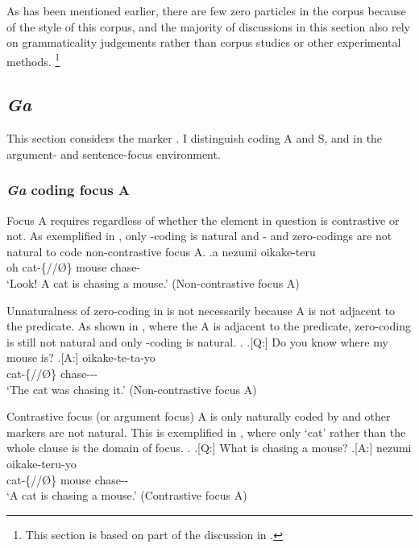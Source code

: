 As has been mentioned earlier,
there are few zero particles in the corpus because of the style of this corpus, and the majority of discussions in this section also rely on grammaticality judgements rather than corpus studies or other experimental methods.%
 \footnote{
 This section is based on part of the discussion in .
 }

\subsection{\textit{Ga}}\label{Par:CasePar:Ga}

This section considers the marker .
I distinguish  coding A and S, and  in the argument- and sentence-focus environment.

\subsubsection{\textit{Ga} coding focus A}

Focus A requires  regardless of
whether the element in question is contrastive or not.
As exemplified in \Next,
only -coding is natural and - and zero-codings are not natural
to code non-contrastive focus A.
%
\exg.\label{ExfocusA}a  nezumi oikake-teru \\
	oh cat-\{//{\O}\} mouse chase- \\
	`Look! A cat is chasing a mouse.' \hfill{(Non-contrastive focus A)}

Unnaturalness of zero-coding in \Last is not necessarily because
A is not adjacent to the predicate.
As shown in \Next,
where the A is adjacent to the predicate,
zero-coding is still not natural
and only -coding is natural.
%
\ex. \a.[Q:] Do you know where my mouse is?
	\bg.[A:]  oikake-te-ta-yo \\
		cat-\{//{\O}\} chase--- \\
		`The cat was chasing it.' \hfill{(Non-contrastive focus A)}

Contrastive focus (or argument focus) A is only naturally coded by 
and other markers are not natural.
This is exemplified in \Next,
where only  `cat' rather than the whole clause is the domain of focus.
%
\ex.
	\a.[Q:] What is chasing a mouse?
	\bg.[A:]  nezumi oikake-teru-yo \\
	cat-\{//{\O}\} mouse chase-- \\
	`A cat is chasing a mouse.' \hfill{(Contrastive focus A)}

